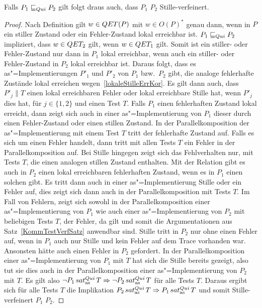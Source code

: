 \begin{Satz}
  \label{StilleTestVerfSatz}
  Falls $P_1 \sqsubseteq  _{Qui} P_2$ gilt folgt draus auch, dass $P_1$ $P_2$
  Stille-verfeinert.
\end{Satz}
\begin{proof}
  Nach Definition gilt $w\in QET (P)$ mit $w\in O(P)^*$ genau dann, wenn in $P$
  ein stiller Zustand oder ein Fehler-Zustand lokal erreichbar ist. $P_1 \sqsubseteq  _{Qui}
  P_2$ impliziert, dass $w\in QET _2$ gilt, wenn $w\in QET _1$ gilt. Somit ist
  ein stiller- oder Fehler-Zustand nur dann in $P_1$ lokal erreichbar, wenn
  auch ein stiller- oder Fehler-Zustand in $P_2$ lokal erreichbar ist. Daraus
  folgt, dass es as"=Implementierungen $P'_1$ und $P'_2$ von $P_1$ bzw.\ $P_2$
  gibt, die analoge fehlerhafte Zustände lokal erreichen
  wegen~\ref{lokaleStilleErrKor}. Es gilt dann auch, dass $P'_j\|T$ einen lokal
  erreichbaren Fehler oder lokal erreichbare Stille hat, wenn $P'_j$ dies hat,
  für $j\in\{1,2\}$ und einen Test $T$. Falls $P_1$ einen fehlerhaften Zustand
  lokal erreicht, dann zeigt sich auch in einer as"=Implementierung von $P_1$
  dieser durch einen Fehler-Zustand oder einen stillen Zustand. In der
  Parallelkomposition der as"=Implementierung mit einem Test $T$ tritt der
  fehlerhafte Zustand auf. Falls es sich um einen Fehler handelt, dann tritt
  mit allen Tests $T$ ein Fehler in der Parallelkomposition auf. Bei Stille
  hingegen zeigt sich das Fehlverhalten nur, mit Tests $T$, die einen analogen
  stillen Zustand enthalten. Mit der Relation \QRel{} gibt es auch in $P_2$
  einen lokal erreichbaren fehlerhaften Zustand, wenn es in $P_1$ einen solchen
  gibt. Es tritt dann auch in einer as"=Implementierung Stille oder ein Fehler
  auf, dies zeigt sich dann auch in der Parallelkomposition mit Tests $T$. Im
  Fall von Fehlern, zeigt sich sowohl in der Parallelkomposition einer
  as"=Implementierung von $P_1$ wie auch einer as"=Implementierung von $P_2$
  mit beliebigen Tests $T$, der Fehler, da \ERel{} gilt und somit die
  Argumentationen aus Satz~\ref{KommTestVerfSatz} anwendbar sind. Stille tritt
  in $P_2$ nur ohne einen Fehler auf, wenn in $P_1$ auch nur Stille und kein
  Fehler auf dem Trace vorhanden war. Ansonsten hätte \ERel{} auch einen Fehler
  in $P_2$ gefordert. In der Parallelkomposition einer as"=Implementierung von
  $P_1$ mit $T$ hat sich die Stille bereits gezeigt, also tut sie dies auch in
  der Parallelkomposition einer as"=Implementierung von $P_2$ mit $T$. Es gilt
  also $\neg P_1 \hspace{0.05cm}sat_\mathrm{as}^{Qui}\hspace{0.05cm} T \Rightarrow \neg P_2 \hspace{0.05cm}sat_\mathrm{as}^{Qui}\hspace{0.05cm} T$ für alle Tests $T$.
  Daraus ergibt sich für alle Tests $T$ die Implikation $P_2 \hspace{0.05cm}sat_\mathrm{as}^{Qui}\hspace{0.05cm} T
  \Rightarrow P_1 \hspace{0.05cm}sat_\mathrm{as}^{Qui}\hspace{0.05cm} T$ und somit Stille-verfeinert $P_1$ $P_2$.
\end{proof}

